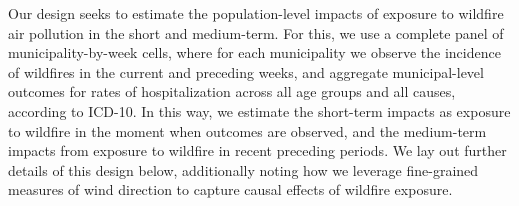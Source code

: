 \documentclass[11pt]{article}
\begin{document}
\begin{spacing}{1.3}


Our design seeks to estimate the population-level impacts of exposure to wildfire air pollution in the short and medium-term.  For this, we use a complete panel of municipality-by-week cells, where for each municipality we observe the incidence of wildfires in the current and preceding weeks, and aggregate municipal-level outcomes for rates of hospitalization across all age groups and all causes, according to ICD-10. In this way, we estimate the short-term impacts as exposure to wildfire in the moment when outcomes are observed, and the medium-term impacts from exposure to wildfire in recent preceding periods. We lay out further details of this design below, additionally noting how we leverage fine-grained measures of wind direction to capture causal effects of wildfire exposure.


\end{spacing}
\end{document}
